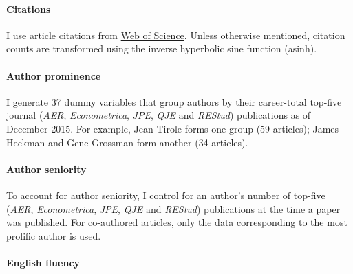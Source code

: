 \begin{appendices}
\begin{refsection}
\paragraph{Citations}
\label{appendixcontrolscitations}

I use article citations from \href{https://login.webofknowledge.com/error/Error?Error=IPError&PathInfo=%2F&RouterURL=https%3A%2F%2Fwww.webofknowledge.com%2F&Domain=.webofknowledge.com&Src=IP&Alias=WOK5}{Web of Science}. Unless otherwise mentioned, citation counts are transformed using the inverse hyperbolic sine function (asinh).

\paragraph{Author prominence}
\label{appendixcontrolsprominence}

I generate 37 dummy variables that group authors by their career-total top-five journal (\emph{AER}, \emph{Econometrica}, \emph{JPE}, \emph{QJE} and \emph{REStud}) publications as of December 2015. For example, Jean Tirole forms one group (59 articles); James Heckman and Gene Grossman form another (34 articles).

\paragraph{Author seniority}
\label{appendixcontrolsseniority}

To account for author seniority, I control for an author's number of top-five (\emph{AER}, \emph{Econometrica}, \emph{JPE}, \emph{QJE} and \emph{REStud}) publications at the time a paper was published. For co-authored articles, only the data corresponding to the most prolific author is used.

\paragraph{English fluency}
\label{appendixcontrolsenglish}


\end{refsection}
\end{appendices}
